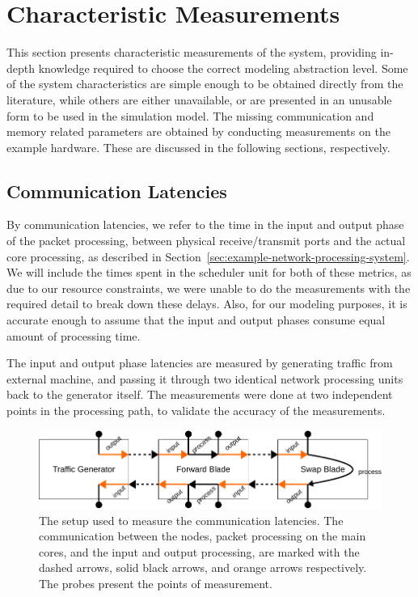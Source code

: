 \section{Characteristic Measurements}
\label{sec:characteristic-measurements}

This section presents characteristic measurements of the system, providing in-depth knowledge required to choose the correct modeling abstraction level. Some of the system characteristics are simple enough to be obtained directly from the literature, while others are either unavailable, or are presented in an unusable form to be used in the simulation model. The missing communication and memory related parameters are obtained by conducting measurements on the example hardware. These are discussed in the following sections, respectively.

\subsection{Communication Latencies}
\label{sec:communication-latencies}

By communication latencies, we refer to the time in the input and output phase of the packet processing, between physical receive/transmit ports and the actual core processing, as described in Section~\ref{sec:example-network-processing-system}. We will include the times spent in the scheduler unit for both of these metrics, as due to our resource constraints, we were unable to do the measurements with the required detail to break down these delays. Also, for our modeling purposes, it is accurate enough to assume that the input and output phases consume equal amount of processing time.

The input and output phase latencies are measured by generating traffic from external machine, and passing it through two identical network processing units back to the generator itself. The measurements were done at two independent points in the processing path, to validate the accuracy of the measurements.

\begin{figure}[]
  \begin{center}
    \includegraphics[width=\textwidth]{images/comm-measurement-setup.pdf}
    \caption{The setup used to measure the communication latencies. The communication between the nodes, packet processing on the main cores, and the input and output processing, are marked with the dashed arrows, solid black arrows, and orange arrows respectively. The probes present the points of measurement.}
    \label{fig:comm-setup}
  \end{center}
\end{figure}

